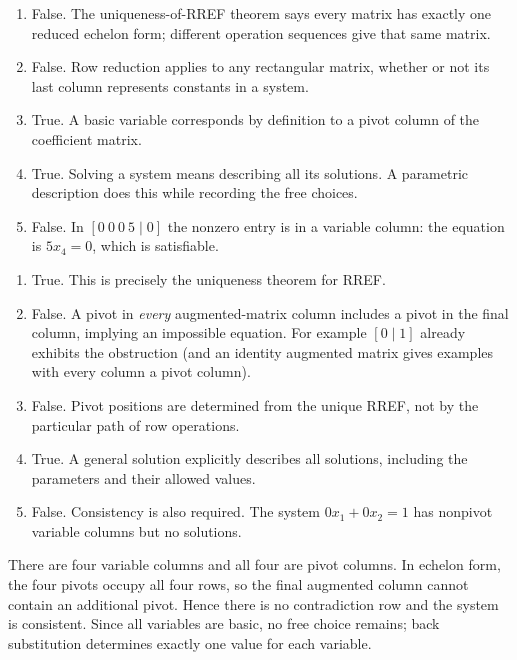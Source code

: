 \begin{enumerate}[label=(\alph*)]
\item False. The uniqueness-of-RREF theorem says every matrix has
exactly one reduced echelon form; different operation sequences give
that same matrix.
\item False. Row reduction applies to any rectangular matrix, whether
or not its last column represents constants in a system.
\item True. A basic variable corresponds by definition to a pivot column
of the coefficient matrix.
\item True. Solving a system means describing all its solutions. A
parametric description does this while recording the free choices.
\item False. In $[0\ 0\ 0\ 5\mid0]$ the nonzero entry is in a
variable column: the equation is $5x_4=0$, which is satisfiable.
\end{enumerate}

\begin{enumerate}[label=(\alph*)]
\item True. This is precisely the uniqueness theorem for RREF.
\item False. A pivot in \emph{every} augmented-matrix column includes
a pivot in the final column, implying an impossible equation.
For example $[0\mid1]$ already exhibits the obstruction (and an identity
augmented matrix gives examples with every column a pivot column).
\item False. Pivot positions are determined from the unique RREF,
not by the particular path of row operations.
\item True. A general solution explicitly describes all solutions,
including the parameters and their allowed values.
\item False. Consistency is also required. The system $0x_1+0x_2=1$
has nonpivot variable columns but no solutions.
\end{enumerate}

There are four variable columns and all four are pivot columns.
In echelon form, the four pivots occupy all four rows, so the final
augmented column cannot contain an additional pivot. Hence there is no
contradiction row and the system is consistent. Since all variables are
basic, no free choice remains; back substitution determines exactly one
value for each variable.

